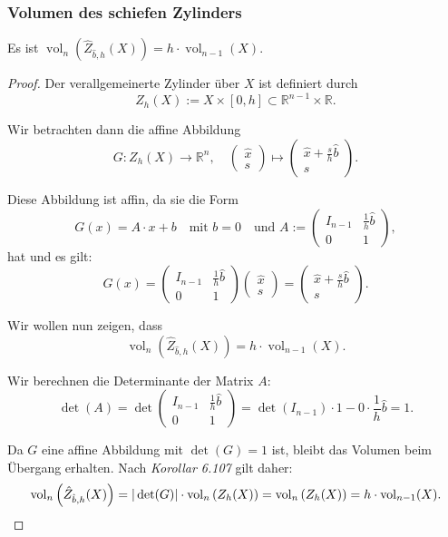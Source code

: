 \documentclass{article}
\begin{document}
\newpage

\subsubsection*{Volumen des schiefen Zylinders}

Es ist $\operatorname{vol}_n \left( \hat{Z}_{\hat{b}, h}(X) \right) = h \cdot \operatorname{vol}_{n-1}(X)$.

\begin{proof}
  Der verallgemeinerte Zylinder über \( X \) ist definiert durch
  \[
  Z_h(X) := X \times [0, h] \subset \mathbb{R}^{n-1} \times \mathbb{R}.
  \]
  
  Wir betrachten dann die affine Abbildung
  \[
  G : Z_h(X) \rightarrow \mathbb{R}^n, \quad \begin{pmatrix} \hat{x} \\ s \end{pmatrix} \mapsto \begin{pmatrix} \hat{x} + \frac{s}{h} \hat{b} \\ s \end{pmatrix}.
  \]
  
  Diese Abbildung ist affin, da sie die Form
  \[
  G(x) = A \cdot x + b
  \quad \text{mit } b = 0
  \quad \text{und }  A := \begin{pmatrix} 
  I_{n-1} & \frac{1}{h} \hat{b} \\
  0 & 1 
  \end{pmatrix},
  \]
  hat und es gilt:
  \[
  G(x) = 
  \begin{pmatrix} 
  I_{n-1} & \frac{1}{h} \hat{b} \\
  0 & 1 
  \end{pmatrix}
  \begin{pmatrix} \hat{x} \\ s \end{pmatrix} = 
  \begin{pmatrix} \hat{x} + \frac{s}{h} \hat{b} \\ s \end{pmatrix}.
  \]
  
  Wir wollen nun zeigen, dass
  \[
  \operatorname{vol}_n \left( \hat{Z}_{\hat{b}, h}(X) \right) = h \cdot \operatorname{vol}_{n-1}(X).
  \]
  
  Wir berechnen die Determinante der Matrix \( A \):
  \[
  \det(A) = \det \begin{pmatrix} I_{n-1} & \frac{1}{h} \hat{b} \\ 0 & 1 \end{pmatrix} 
  = \det(I_{n-1}) \cdot 1 - 0 \cdot \frac{1}{h} \hat{b} = 1.
  \]
  
  Da \( G \) eine affine Abbildung mit \( \det(G) = 1 \) ist, bleibt das Volumen beim Übergang erhalten.
  Nach \textit{Korollar 6.107} gilt daher:
  \[
  \operatorname{vol}_n \left( \hat{Z}_{\hat{b}, h}(X) \right) = |\det(G)| \cdot \operatorname{vol}_n \left( Z_h(X) \right)
  =  \operatorname{vol}_n \left( Z_h(X) \right) = h \cdot \operatorname{vol}_{n-1}(X).
  \qedhere
  \]
  
\end{proof}
\end{document}
